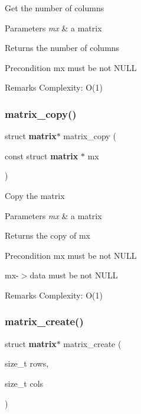 Get the number of columns


\begin{DoxyParams}{Parameters}
{\em mx} & a matrix \\
\hline
\end{DoxyParams}
\begin{DoxyReturn}{Returns}
the number of columns
\end{DoxyReturn}
\begin{DoxyPrecond}{Precondition}
{\ttfamily mx} must be not N\+U\+LL
\end{DoxyPrecond}
\begin{DoxyRemark}{Remarks}
Complexity\+: O(1) 
\end{DoxyRemark}
\mbox{\label{matrix_8h_a6663b065febb290385857b26fdb1a353}} 
\subsubsection{matrix\+\_\+copy()}
{\footnotesize\ttfamily struct \textbf{ matrix}$\ast$ matrix\+\_\+copy (\begin{DoxyParamCaption}\item[{const struct \textbf{ matrix} $\ast$}]{mx }\end{DoxyParamCaption})}

Copy the matrix


\begin{DoxyParams}{Parameters}
{\em mx} & a matrix \\
\hline
\end{DoxyParams}
\begin{DoxyReturn}{Returns}
the copy of {\ttfamily mx}
\end{DoxyReturn}
\begin{DoxyPrecond}{Precondition}
{\ttfamily mx} must be not N\+U\+LL 

{\ttfamily mx-\/$>$data} must be not N\+U\+LL
\end{DoxyPrecond}
\begin{DoxyRemark}{Remarks}
Complexity\+: O(1) 
\end{DoxyRemark}
\mbox{\label{matrix_8h_ad2d40d9c13eba774d6bb788021242a95}} 
\subsubsection{matrix\+\_\+create()}
{\footnotesize\ttfamily struct \textbf{ matrix}$\ast$ matrix\+\_\+create (\begin{DoxyParamCaption}\item[{size\+\_\+t}]{rows,  }\item[{size\+\_\+t}]{cols }\end{DoxyParamCaption})}

